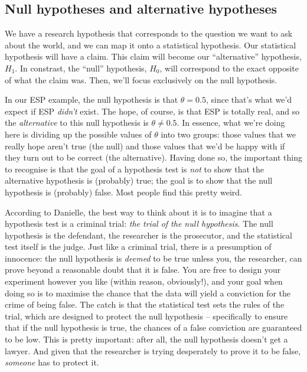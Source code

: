 \documentclass[
]{book}
\theoremstyle{definition}
\theoremstyle{definition}
\theoremstyle{definition}
\theoremstyle{definition}
\theoremstyle{remark}
\begin{document}
\hypertarget{null-hypotheses-and-alternative-hypotheses}{%
\subsection{Null hypotheses and alternative hypotheses}\label{null-hypotheses-and-alternative-hypotheses}}

We have a research hypothesis that corresponds to the question we want to ask about the world, and we can map it onto a statistical hypothesis. Our statistical hypothesis will have a claim. This claim will become our ``alternative'' hypothesis, \(H_1\). In constrast, the ``null'' hypothesis, \(H_0\), will correspond to the exact opposite of what the claim was. Then, we'll focus exclusively on the null hypothesis.

In our ESP example, the null hypothesis is that \(\theta = 0.5\), since that's what we'd expect if ESP \emph{didn't} exist. The hope, of course, is that ESP is totally real, and so the \emph{alternative} to this null hypothesis is \(\theta \neq 0.5\). In essence, what we're doing here is dividing up the possible values of \(\theta\) into two groups: those values that we really hope aren't true (the null) and those values that we'd be happy with if they turn out to be correct (the alternative). Having done so, the important thing to recognise is that the goal of a hypothesis test is \emph{not} to show that the alternative hypothesis is (probably) true; the goal is to show that the null hypothesis is (probably) false. Most people find this pretty weird.

According to Danielle, the best way to think about it is to imagine that a hypothesis test is a criminal trial: \emph{the trial of the null hypothesis}. The null hypothesis is the defendant, the researcher is the prosecutor, and the statistical test itself is the judge. Just like a criminal trial, there is a presumption of innocence: the null hypothesis is \emph{deemed} to be true unless you, the researcher, can prove beyond a reasonable doubt that it is false. You are free to design your experiment however you like (within reason, obviously!), and your goal when doing so is to maximise the chance that the data will yield a conviction for the crime of being false. The catch is that the statistical test sets the rules of the trial, which are designed to protect the null hypothesis -- specifically to ensure that if the null hypothesis is true, the chances of a false conviction are guaranteed to be low. This is pretty important: after all, the null hypothesis doesn't get a lawyer. And given that the researcher is trying desperately to prove it to be false, \emph{someone} has to protect it.
\end{document}
